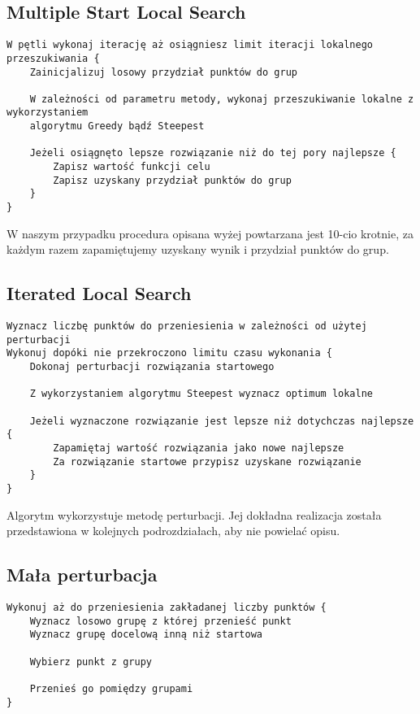 \documentclass[main.tex]{subfiles}
\begin{document}
\subsection{Multiple Start Local Search}
\begin{verbatim}
W pętli wykonaj iterację aż osiągniesz limit iteracji lokalnego przeszukiwania {
    Zainicjalizuj losowy przydział punktów do grup

    W zależności od parametru metody, wykonaj przeszukiwanie lokalne z wykorzystaniem
    algorytmu Greedy bądź Steepest

    Jeżeli osiągnęto lepsze rozwiązanie niż do tej pory najlepsze {
        Zapisz wartość funkcji celu
        Zapisz uzyskany przydział punktów do grup
    }
}
\end{verbatim}
W naszym przypadku procedura opisana wyżej powtarzana jest 10-cio krotnie, za każdym razem zapamiętujemy uzyskany wynik i przydział punktów do grup.

\subsection{Iterated Local Search}
\begin{verbatim}
Wyznacz liczbę punktów do przeniesienia w zależności od użytej perturbacji
Wykonuj dopóki nie przekroczono limitu czasu wykonania {
    Dokonaj perturbacji rozwiązania startowego

    Z wykorzystaniem algorytmu Steepest wyznacz optimum lokalne

    Jeżeli wyznaczone rozwiązanie jest lepsze niż dotychczas najlepsze {
        Zapamiętaj wartość rozwiązania jako nowe najlepsze
        Za rozwiązanie startowe przypisz uzyskane rozwiązanie
    }
}
\end{verbatim}
Algorytm wykorzystuje metodę perturbacji. Jej dokładna realizacja została przedstawiona w kolejnych podrozdziałach, aby nie powielać opisu.

\subsection{Mała perturbacja}
\begin{verbatim}
Wykonuj aż do przeniesienia zakładanej liczby punktów {
    Wyznacz losowo grupę z której przenieść punkt
    Wyznacz grupę docelową inną niż startowa

    Wybierz punkt z grupy

    Przenieś go pomiędzy grupami
}
\end{verbatim}
\end{document}
